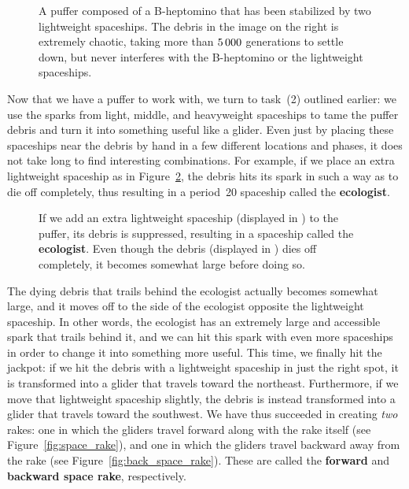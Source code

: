 \begin{figure}[!htb]
	\centering{}
	\caption{A puffer composed of a B-heptomino that has been stabilized by two lightweight spaceships. The debris in the image on the right is extremely chaotic, taking more than $5{\,}000$ generations to settle down, but never interferes with the B-heptomino or the lightweight spaceships.}\label{fig:puffer_2}
\end{figure}

Now that we have a puffer to work with, we turn to task~(2) outlined earlier: we use the sparks from light, middle, and heavyweight spaceships to tame the puffer debris and turn it into something useful like a glider. Even just by placing these spaceships near the debris by hand in a few different locations and phases, it does not take long to find interesting combinations. For example, if we place an extra lightweight spaceship as in Figure~\ref{fig:ecologist}, the debris hits its spark in such a way as to die off completely, thus resulting in a period~20 spaceship called the \textbf{ecologist}.

\begin{figure}[!htb]
	\centering{}
	\caption{If we add an extra lightweight spaceship (displayed in ) to the puffer, its debris is suppressed, resulting in a spaceship called the \textbf{ecologist}. Even though the debris (displayed in ) dies off completely, it becomes somewhat large before doing so.}\label{fig:ecologist}
\end{figure}

The dying debris that trails behind the ecologist actually becomes somewhat large, and it moves off to the side of the ecologist opposite the lightweight spaceship. In other words, the ecologist has an extremely large and accessible spark that trails behind it, and we can hit this spark with even more spaceships in order to change it into something more useful. This time, we finally hit the jackpot: if we hit the debris with a lightweight spaceship in just the right spot, it is transformed into a glider that travels toward the northeast. Furthermore, if we move that lightweight spaceship slightly, the debris is instead transformed into a glider that travels toward the southwest. We have thus succeeded in creating \emph{two} rakes: one in which the gliders travel forward along with the rake itself (see Figure~\ref{fig:space_rake}), and one in which the gliders travel backward away from the rake (see Figure~\ref{fig:back_space_rake}). These are called the \textbf{forward} and \textbf{backward space rake}, respectively.

